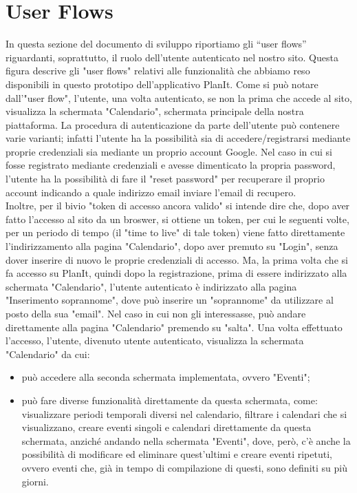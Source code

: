 \section{User Flows}
\label{secD4:UserFlows}

In questa sezione del documento di sviluppo riportiamo gli “user flows” riguardanti, soprattutto, il ruolo dell'utente autenticato nel nostro sito.
Questa figura descrive gli "user flows" relativi alle funzionalità che abbiamo reso disponibili in questo prototipo dell'applicativo PlanIt. Come si può notare dall'"user flow", l'utente, una volta autenticato, se non la prima che accede al sito, visualizza la schermata "Calendario", schermata principale della nostra piattaforma. La procedura di autenticazione da parte dell'utente può contenere varie varianti; infatti l'utente ha la possibilità sia di accedere/registrarsi mediante proprie credenziali sia mediante un proprio account Google. Nel caso in cui si fosse registrato mediante credenziali e avesse dimenticato la propria password, l'utente ha la possibilità di fare il "reset password" per recuperare il proprio account indicando a quale indirizzo email inviare l'email di recupero. \\ Inoltre, per il bivio "token di accesso ancora valido" si intende dire che, dopo aver fatto l'accesso al sito da un broswer, si ottiene un token, per cui le seguenti volte, per un periodo di tempo (il "time to live" di tale token) viene fatto direttamente l'indirizzamento alla pagina "Calendario", dopo aver premuto su "Login", senza dover inserire di nuovo le proprie credenziali di accesso. Ma, la prima volta che si fa accesso su PlanIt, quindi dopo la registrazione, prima di essere indirizzato alla schermata "Calendario", l'utente autenticato è indirizzato alla pagina "Inserimento soprannome", dove può inserire un "soprannome" da utilizzare al posto della sua "email". Nel caso in cui non gli interessasse, può andare direttamente alla pagina "Calendario" premendo su "salta".
Una volta effettuato l'accesso, l'utente, divenuto utente autenticato, visualizza la schermata "Calendario" da cui:
\begin{itemize}
    \item può accedere alla seconda schermata implementata, ovvero "Eventi";
    \item può fare diverse funzionalità direttamente da questa schermata, come: visualizzare periodi temporali diversi nel calendario, filtrare i calendari che si visualizzano, creare eventi singoli e calendari direttamente da questa schermata, anziché andando nella schermata "Eventi", dove, però, c'è anche la possibilità di modificare ed eliminare quest'ultimi e creare eventi ripetuti, ovvero eventi che, già in tempo di compilazione di questi, sono definiti su più giorni.
\end{itemize}
